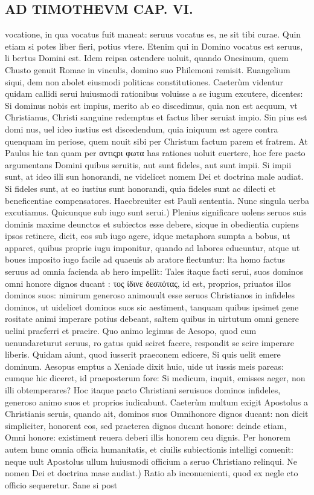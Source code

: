 \documentclass{article}
\begin{document}
\begin{pages}
\section*{AD TIMOTHEVM CAP. VI. }
\marginpar{[ p.120 ]}\pstart vocatione, in qua vocatus fuit maneat: seruus vocatus es, ne sit tibi curae. Quin etiam si potes liber fieri, potius vtere. Etenim qui in Domino vocatus est seruus, li bertus Domini est. Idem reipsa ostendere uoluit, quando Onesimum, quem Chusto genuit Romae in vinculis, domino suo Philemoni remisit. Euangelium siqui, dem non abolet eiusmodi politicas constitutiones. Caeterùm videntur quidam callidi serui huiusmodi rationibus voluisse a se iugum excutere, dicentes: Si dominus nobis est impius, merito ab eo discedimus, quia non est aequum, vt Christianus, Christi sanguine redemptus et factus liber seruiat impio. Sin pius est domi nus, uel ideo iustius est discedendum, quia iniquum est agere contra quenquam im periose, quem nouit sibi per Christum factum parem et fratrem. At Paulus hic tan quam per αντιςρι φωτα has rationes uoluit euertere, hoc fere pacto argumentans Domini quibus seruitis, aut sunt fideles, aut sunt impii. Si impii sunt, at ideo illi sun honorandi, ne videlicet nomem Dei et doctrina male audiat. Si fideles sunt, at eo iustius sunt honorandi, quia fideles sunt ac dilecti et beneficentiae compensatores. Haecbreuiter est Pauli sententia. Nunc singula uerba excutiamus.  \pend\pstart Quicunque sub iugo sunt serui.) Plenius significare uolens seruos suis dominis maxime deunctos et subiectos esse debere, sicque in obedientia cupiens ipsos retinere, dicit, eos sub iugo agere, idque metaphora sumpta a bobus, ut apparet, quibus proprie iugu imponitur, quando ad labores educuntur, atque ut boues imposito iugo facile ad quaeuis ab aratore flectuntur: lta homo factus seruus ad omnia facienda ab hero impellit: Tales itaque facti serui, suos dominos omni honore dignos ducant : τος ἰδινε δεσπότας, id est, proprios, priuatos illos dominos suos: nimirum generoso animouult esse seruos Christianos in infideles dominos, ut uidelicet dominos suos sic aestiment, tanquam quibus ipsimet gene rositate animi imperare potius debeant, saltem quibus in uirtutum omni genere uelini praeferri et praeire. Quo animo legimus de Aesopo, quod cum uenundareturut seruus, ro gatus quid sciret facere, respondit se scire imperare liberis. Quidam aiunt, quod iusserit praeconem edicere, Si quis uelit emere dominum. Aesopus emptus a Xeniade dixit huic, uide ut iussis meis pareas: cumque hic diceret, id praeposterum fore: Si medicum, inquit, emisses aeger, non illi obtemperares? Hoc itaque pacto Christiani seruisuos dominos infideles, generoso animo suos et proprios iudicabunt. Caeterùm multum exigit Apostolus a Christianis seruis, quando ait, dominos suos Omnihonore dignos ducant: non dicit simpliciter, honorent eos, sed praeterea dignos ducant honore: deinde etiam, Omni honore: existiment reuera deberi illis honorem ceu dignis. Per honorem autem hunc omnia officia humanitatis, et ciuilis subiectionis intelligi conuenit: neque uult Apostolus ullum huiusmodi officium a seruo Christiano relinqui.  \pend\pstart Ne nomen Dei et doctrina mase audiat.) Ratio ab inconuenienti, quod ex negle cto officio sequeretur. Sane si post 
\end{pages}
\end{document}
